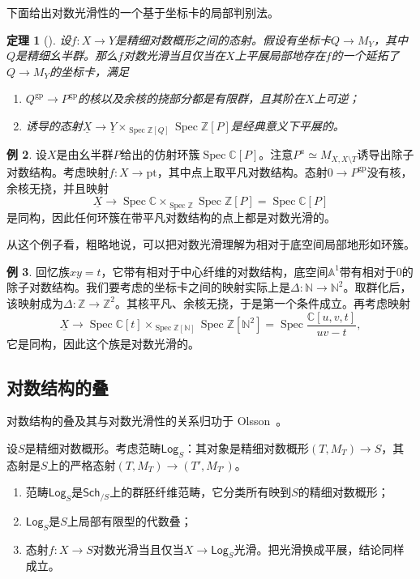 \documentclass{amsart}
\newtheorem{thm}{定理}[section]
\theoremstyle{definition}
\newtheorem{exm}[thm]{例}
\theoremstyle{remark}
\theoremstyle{plain}
\theoremstyle{definition}
\theoremstyle{remark}
\newcommand{\A}{\mathbb{A}}
\newcommand{\N}{\mathbb{N}}
\newcommand{\C}{\mathbb{C}}
\newcommand{\Z}{\mathbb{Z}}
\newcommand{\mr}[1]{\mathrm{#1}}
\newcommand{\ms}[1]{\mathsf{#1}}
\newcommand{\ul}[1]{\underline{#1}}
\newcommand{\1}{\mathbf{1}}
\newcommand{\2}{\mathbf{2}}
\newcommand{\3}{\mathbf{3}}
\DeclareMathOperator{\Spec}{Spec}
\begin{document}
下面给出对数光滑性的一个基于坐标卡的局部判别法。

\begin{thm}[{\cite[定理~3.5]{Kato1989}}]
    设\(f \colon X \to Y\)是精细对数概形之间的态射。假设有坐标卡\(Q \to M_Y\)，其中\(Q\)是精细幺半群。那么\(f\)对数光滑当且仅当在\(X\)上平展局部地存在\(f\)的一个延拓了\(Q \to M_Y\)的坐标卡，满足
    \begin{enumerate}
        \item \(Q^{\mr{gp}} \to P^{\mr{gp}}\)的核以及余核的挠部分都是有限群，且其阶在\(X\)上可逆；
        \item 诱导的态射\(\ul{X} \to \ul{Y} \times_{\Spec \Z[Q]} \Spec \Z[P]\)是经典意义下平展的。
    \end{enumerate}
\end{thm}

\begin{exm}
    设\(X\)是由幺半群\(P\)给出的仿射环簇\(\Spec \C[P]\)。注意\(P^a \simeq M_{X, X \setminus T}\)诱导出除子对数结构。考虑映射\(f \colon X \to \mr{pt}\)，其中点上取平凡对数结构。态射\(0 \to P^{\mr{gp}}\)没有核，余核无挠，并且映射
    \[ \ul{X} \to \Spec \C \times_{\Spec \Z} \Spec \Z[P] = \Spec \C[P] \]
    是同构，因此任何环簇在带平凡对数结构的点上都是对数光滑的。
\end{exm}

从这个例子看，粗略地说，可以把对数光滑理解为相对于底空间局部地形如环簇。

\begin{exm}
    回忆族\(xy = t\)，它带有相对于中心纤维的对数结构，底空间\(\A^1\)带有相对于\(0\)的除子对数结构。我们要考虑的坐标卡之间的映射实际上是\(\Delta \colon \N \to \N^2\)。取群化后，该映射成为\(\Delta \colon \Z \to \Z^2\)。其核平凡、余核无挠，于是第一个条件成立。再考虑映射
    \[ \ul{X} \to \Spec \C[t] \times_{\Spec \Z[\N]} \Spec \Z[\N^2] = \Spec \frac{\C[u,v,t]}{uv-t}, \]
    它是同构，因此这个族是对数光滑的。
\end{exm}

\subsection{对数结构的叠}%
\label{sub:Stack of log structures}

对数结构的叠及其与对数光滑性的关系归功于 Olsson~\cite{Olsson2003}。

设\(S\)是精细对数概形。考虑范畴\(\ms{Log}_S\)：其对象是精细对数概形\((T, M_T) \to S\)，其态射是\(S\)上的严格态射\((T, M_T) \to (T', M_{T'})\)。
\begin{enumerate}
    \item 范畴\(\ms{Log}_S\)是\(\ms{Sch}_{/S}\)上的群胚纤维范畴，它分类所有映到\(S\)的精细对数概形；
    \item \(\ms{Log}_S\)是\(S\)上局部有限型的代数叠；
    \item 态射\(f \colon X \to S\)对数光滑当且仅当\(X \to \ms{Log}_S\)光滑。把光滑换成平展，结论同样成立。
\end{enumerate}
\end{document}
